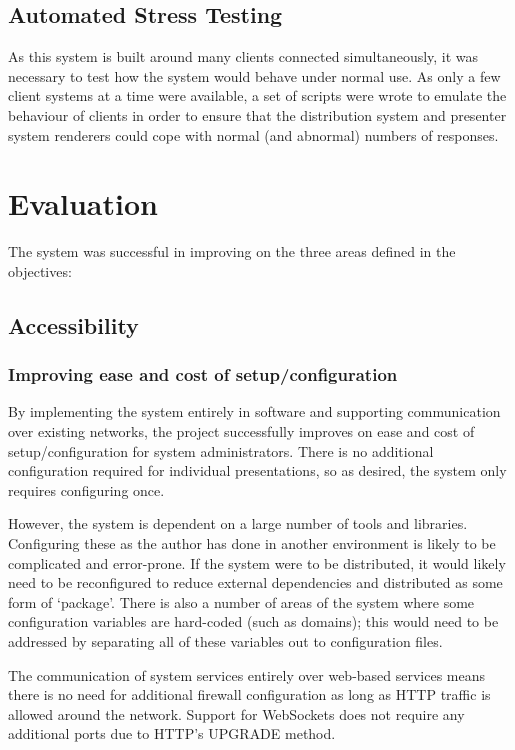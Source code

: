 \documentclass[a4papert,11pt,notitlepage]{ltxdoc}
\begin{document}

\subsection{Automated Stress Testing}
As this system is built around many clients connected simultaneously, it was necessary to test how the system would behave under normal use. As only a few client systems at a time were available, a set of scripts were wrote to emulate the behaviour of clients in order to ensure that the distribution system and presenter system renderers could cope with normal (and abnormal) numbers of responses.

\pagebreak
\section{Evaluation}
The system was successful in improving on the three areas defined in the objectives:

\subsection{Accessibility}
\subsubsection{Improving ease and cost of setup/configuration}
By implementing the system entirely in software and supporting communication over existing networks, the project successfully improves on ease and cost of setup/configuration for system administrators. There is no additional configuration required for individual presentations, so as desired, the system only requires configuring once.

However, the system is dependent on a large number of tools and libraries. Configuring these as the author has done in another environment is likely to be complicated and error-prone. If the system were to be distributed, it would likely need to be reconfigured to reduce external dependencies and distributed as some form of `package'. There is also a number of areas of the system where some configuration variables are hard-coded (such as domains); this would need to be addressed by separating all of these variables out to configuration files.

The communication of system services entirely over web-based services means there is no need for additional firewall configuration as long as HTTP traffic is allowed around the network. Support for WebSockets does not require any additional ports due to HTTP's UPGRADE method. 
\end{document}
